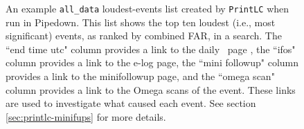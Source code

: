 \clearpage

\begin{figure}[p]
\label{fig:example-loudest_all_data_events}
\center
{}
\caption{An example \texttt{all\_data} loudest-events list created by
\texttt{PrintLC} when run in Pipedown. This list shows the top ten loudest
(i.e., most significant) events, as ranked by combined FAR, in a search. The
``end time utc" column provides a link to the daily \ihope~page
\cite{Pekowsky:thesis}, the ``ifos" column provides a link to the e-log page,
the ``mini followup" column provides a link to the minifollowup page, and the
``omega scan" column provides a link to the Omega scans of the event. These
links are used to investigate what caused each event. See section
\ref{sec:printlc-minifups} for more details.}
\end{figure}

